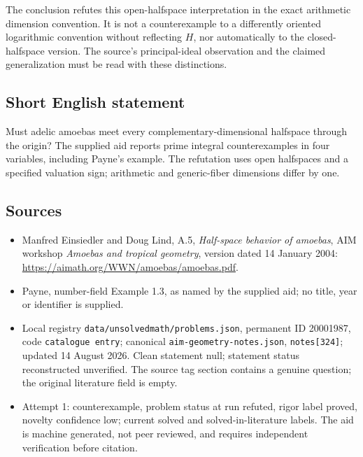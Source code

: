\documentclass[11pt]{article}
\begin{document}
The conclusion refutes this open-halfspace interpretation in the exact arithmetic dimension convention. It is not a counterexample to a differently oriented logarithmic convention without reflecting \(H\), nor automatically to the closed-halfspace version. The source's principal-ideal observation and the claimed generalization must be read with these distinctions.
\subsection{Short English statement}
Must adelic amoebas meet every complementary-dimensional halfspace through the origin? The supplied aid reports prime integral counterexamples in four variables, including Payne's example. The refutation uses open halfspaces and a specified valuation sign; arithmetic and generic-fiber dimensions differ by one.
\subsection{Sources}
\begin{itemize}
\item Manfred Einsiedler and Doug Lind, A.5, \emph{Half-space behavior of amoebas}, AIM workshop \emph{Amoebas and tropical geometry}, version dated 14 January 2004: \url{https://aimath.org/WWN/amoebas/amoebas.pdf}.
\item Payne, number-field Example 1.3, as named by the supplied aid; no title, year or identifier is supplied.
\item Local registry \texttt{data/unsolvedmath/problems.json}, permanent ID 20001987, code \texttt{catalogue entry}; canonical \texttt{aim-geometry-notes.json}, \texttt{notes[324]}; updated 14 August 2026. Clean statement null; statement status reconstructed unverified. The source tag section contains a genuine question; the original literature field is empty.
\item Attempt 1: counterexample, problem status at run refuted, rigor label proved, novelty confidence low; current solved and solved-in-literature labels. The aid is machine generated, not peer reviewed, and requires independent verification before citation.
\end{itemize}
\end{document}
